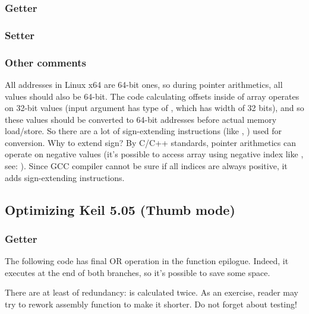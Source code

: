 \subsubsection{Getter}



\subsubsection{Setter}



\subsubsection{Other comments}

All addresses in Linux x64 are 64-bit ones, so during pointer arithmetics, all values should also be 64-bit.
The code calculating offsets inside of array operates on 32-bit values (input  argument has type of , which has width of 32 bits),
and so these values should be converted to 64-bit addresses before actual memory load/store.
So there are a lot of sign-extending instructions (like , ) used for conversion.
Why to extend sign? By C/C++ standards, pointer arithmetics can operate on negative values 
(it's possible to access array using negative index like , see: ).
Since GCC compiler cannot be sure if all indices are always positive, it adds sign-extending instructions.

\subsection{Optimizing Keil 5.05 (Thumb mode)}

\subsubsection{Getter}

The following code has final OR operation in the function epilogue.
Indeed, it executes at the end of both branches, so it's possible to save some space.



There are at least of redundancy:  is calculated twice.
As an exercise, reader may try to rework assembly function to make it shorter. Do not forget about testing!

